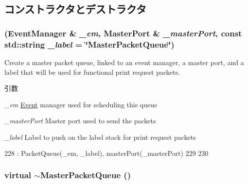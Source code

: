 \subsection{コンストラクタとデストラクタ}
\hypertarget{classMasterPacketQueue_a95398bd9589a013635d2d0900aeb04a7}{
\subsubsection[{MasterPacketQueue}]{ ({\bf EventManager} \& {\em \_\-em}, \/  {\bf MasterPort} \& {\em \_\-masterPort}, \/  const std::string {\em \_\-label} = {\ttfamily \char`\"{}MasterPacketQueue\char`\"{}})}}
\label{classMasterPacketQueue_a95398bd9589a013635d2d0900aeb04a7}
Create a master packet queue, linked to an event manager, a master port, and a label that will be used for functional print request packets.


\begin{DoxyParams}{引数}
\item[{\em \_\-em}]\hyperlink{classEvent}{Event} manager used for scheduling this queue \item[{\em \_\-masterPort}]Master port used to send the packets \item[{\em \_\-label}]Label to push on the label stack for print request packets \end{DoxyParams}



\begin{DoxyCode}
228     : PacketQueue(_em, _label), masterPort(_masterPort)
229 {
230 }
\end{DoxyCode}
\hypertarget{classMasterPacketQueue_a24fcd3b9d1504075d27a0cef1ee13ade}{
\subsubsection[{$\sim$MasterPacketQueue}]{\setlength{\rightskip}{0pt plus 5cm}virtual $\sim${\bf MasterPacketQueue} ()}}
\label{classMasterPacketQueue_a24fcd3b9d1504075d27a0cef1ee13ade}



